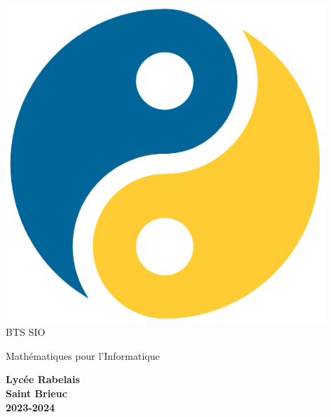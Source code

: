 \begin{titlepage}
    \vspace*{3cm}
    \begin{center}
        \includegraphics[width=12cm]{titlepage/img/yin_yang_python}\\[2em]

        {
            \bigtitlefont 
            \LARGE\color{gray} BTS SIO}

        {
            \titlefont
            \Large\color{gray} Mathématiques pour l'Informatique\\[2em]}

        {\color{gray}\textbf{Lycée Rabelais\\ Saint Brieuc\\ 2023-2024}}
    \end{center}
\end{titlepage}